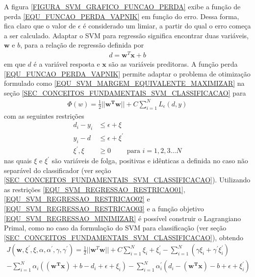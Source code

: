A figura \ref{FIGURA_SVM_GRAFICO_FUNCAO_PERDA} exibe a função de perda \ref{EQU_FUNCAO_PERDA_VAPNIK} em função do erro. Dessa forma, fica claro que o valor de \(\epsilon\) é considerado um limiar, a partir do qual o erro começa a ser calculado. Adaptar o SVM para regressão significa encontrar duas variáveis, \(\mathbf{w}\) e \(b\), para a relação de regressão definida por
\begin{align}
d = \mathbf{w}^{T}\mathbf{x} + b
\end{align}
em que \(d\) é a variável resposta e \(\mathbf{x}\) são as variáveis preditoras. A função perda \eqref{EQU_FUNCAO_PERDA_VAPNIK} permite adaptar o problema de otimização formulado como \eqref{EQU_SVM_MARGEM_EQUIVALENTE_MAXIMIZAR} na seção \ref{SEC_CONCEITOS_FUNDAMENTAIS_SVM_CLASSIFICACAO} para
\begin{align}
\Phi(w) =  \frac{1}{2}||\mathbf{w^{T}}\mathbf{w}|| + C \sum\limits_{i=1}^{N} L_{\epsilon}(d, y) \label{EQU_SVM_REGRESSAO_MINIMIZAR}
\end{align}
com as seguintes restrições
\begin{align}
d_{i} - y_{i} &\leq \epsilon + \xi					 \label{EQU_SVM_REGRESSAO_RESTRICAO01} 		\\
y_{i} - d  &\leq \epsilon + \xi^{'}			 \label{EQU_SVM_REGRESSAO_RESTRICAO02} 		\\
\xi^{'}, \xi &\geq 0 \qquad \textrm{ para } i =1, 2, 3 \ldots N \label{EQU_SVM_REGRESSAO_RESTRICAO03}
\end{align}
nas quais \(\xi\) e \(\xi^{'}\) são variáveis de folga, positivas e idênticas a definida no caso não separável do classificador (ver seção \ref{SEC_CONCEITOS_FUNDAMENTAIS_SVM_CLASSIFICACAO}). Utilizando as restrições \eqref{EQU_SVM_REGRESSAO_RESTRICAO01}, \eqref{EQU_SVM_REGRESSAO_RESTRICAO02} e \eqref{EQU_SVM_REGRESSAO_RESTRICAO03} e a função objetivo \eqref{EQU_SVM_REGRESSAO_MINIMIZAR} é possível construir o Lagrangiano Primal, como no caso da formulação do SVM para classificação (ver seção \ref{SEC_CONCEITOS_FUNDAMENTAIS_SVM_CLASSIFICACAO}), obtendo
\begin{align}
\nonumber J(\mathbf{w}, \xi^{'}, \xi, \alpha, \alpha^{'}, \gamma, \gamma^{'}) = \frac{1}{2}||\mathbf{w}^{T}\mathbf{w}|| + C \sum\limits_{i=1}^{N} \xi_{i} + \xi_{i}^{'} - \sum\limits_{i=1}^{N} ( \gamma\xi_{i} + \gamma^{'}\xi_{i}^{'} ) \\
-\sum\limits_{i=1}^{N}\alpha_{i}((\mathbf{w^{T}x}) + b - d_{i}+ \epsilon + \xi_{i}) - \sum\limits_{i=1}^{N}\alpha_{i}^{'}(d_{i} - (\mathbf{w^{T}x}) - b + \epsilon + \xi_{i}^{'}) \label{EQU_SVM_REGRESSAO_LAGRANGIANO_PRIMAL}
\end{align}
